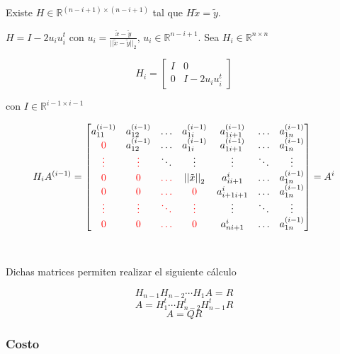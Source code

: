\begin{itemize}
    \
    
    \noindent Existe $H \in \mathbb{R}^{(n-i+1)\times(n-i+1)}$ tal que $H\tilde{x} = \tilde{y}$.
    
    \noindent $H = I - 2u_{i}u_{i}^{t}$ con $u_i = \frac{\tilde{x} - \tilde{y}}{{||\tilde{x} - \tilde{y}||}_{2}}$, $u_i \in \mathbb{R}^{n-i+1}$. 
    Sea $H_i \in \mathbb{R}^{n \times n}$
    
    \[H_i = \begin{bmatrix}
        I & 0 \\
        0 & I - 2u_{i}u_{i}^{t}
    \end{bmatrix}\]

    con $I \in \mathbb{R}^{i-1 \times i -1}$

    \[H_{i}A^{(i-1)} = \begin{bmatrix}
        a_{11}^{(i-1)} & a_{12}^{(i-1)} & \ldots & a_{1i}^{(i-1)} & a_{1i+1}^{(i-1)} & \ldots & a_{1n}^{(i-1)} \\
        \textcolor{red}{0} & a_{12}^{(i-1)} & \ldots & a_{1i}^{(i-1)} & a_{1i+1}^{(i-1)} & \ldots & a_{1n}^{(i-1)} \\
        \textcolor{red}{\vdots} & \textcolor{red}{\vdots} & \ddots & \vdots & \vdots & \ddots & \vdots \\
        \textcolor{red}{0} & \textcolor{red}{0} & \textcolor{red}{\ldots} & {||\tilde{x}||}_{2} & a_{ii+1}^{i} & \ldots & a_{1n}^{(i-1)} \\
        \textcolor{red}{0} & \textcolor{red}{0} & \textcolor{red}{\ldots} & \textcolor{red}{0} & a_{i+1i+1}^{i} & \ldots & a_{1n}^{(i-1)} \\
        \textcolor{red}{\vdots} & \textcolor{red}{\vdots} & \textcolor{red}{\ddots} & \textcolor{red}{\vdots} & \vdots & \ddots & \vdots \\
        \textcolor{red}{0} & \textcolor{red}{0} & \textcolor{red}{\ldots} & \textcolor{red}{0} & a_{ni+1}^{i} & \ldots & a_{1n}^{(i-1)} \\
    \end{bmatrix} = A^{i}\]   
    
\end{itemize}

\

\noindent Dichas matrices permiten realizar el siguiente cálculo

\[H_{n-1}H_{n-2}\cdots H_{1}A = R\]
\[A = H_{1}^{t}\cdots H_{n-2}^{t}H_{n-1}^{t}R\]
\[A = QR\]

\subsubsection{Costo}\label{subsubsec:householder_costo}

